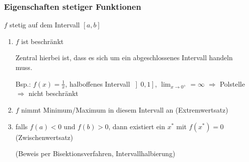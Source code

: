 \subsubsection*{Eigenschaften stetiger Funktionen}

$f$ stetig auf dem Intervall $\left[a,b\right]$
  \begin{enumerate}
    \item $f$ ist beschränkt
      \begin{note}
        Zentral hierbei ist, dass es sich um ein abgeschlossenes Intervall handeln muss.

        Bsp.: $f(x) = \frac 1 x$, halboffenes Intervall $\left]0,1\right]$, $\displaystyle\lim_{x\rightarrow 0^+} = \infty$ $\Rightarrow$ Polstelle $\Rightarrow$ nicht beschränkt
      \end{note}
    \item $f$ nimmt Minimum/Maximum in diesem Intervall an (Extremwertsatz)
    \item falls $f(a) < 0$ und $f(b) > 0$, dann existiert ein $x^\ast$ mit $f(x^\ast) = 0$ (Zwischenwertsatz)
    
      (Beweis per Bisektionsverfahren, Intervallhalbierung)
  \end{enumerate}
